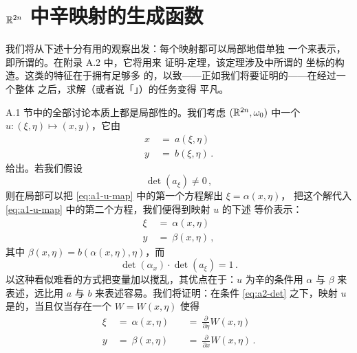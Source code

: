 

\section{\texorpdfstring{$\mathbb{R}^{2n}$ 中辛映射的生成函数}{R2n 中辛映射的生成函数}}
\label{sec:generating-functions}

我们将从下述十分有用的观察出发：每个\trSymplectic{}映射都可以局部地借单独%
一个\trScalarFunction{}来表示，即所谓的\trGeneratingFunction。在附录 A.2 中，它将用来%
证明\trArnold-\trJost{}定理，该定理涉及\trIntegrableSystem{}中所谓的%
\trActionAngle{}坐标的构造。这类\trHamiltonianSystem{}的特征在于拥有足够多%
的\trFirstIntegral，以致——正如我们将要证明的——在经过一个整体\trSymplectic{}%
\trTransformation{}之后，求解（或者说「\trIntegral」）\trDifferentialEquation{}的任务变得%
平凡。

A.1 节中的全部讨论本质上都是局部性的。我们考虑 $(\mathbb{R}^{2n},\omega_{0})$ 中一个%
\trSymplectic\trMapping{} $u:(\xi,\eta)\mapsto(x,y)$，它由
\begin{equation}\label{eq:a1-u-map}
\begin{aligned}
x\ &=\ a(\xi,\eta)\\
y\ &=\ b(\xi,\eta)\,.
\end{aligned}
\end{equation}
给出。若我们假设
\begin{equation}\label{eq:a2-det}
\det(a_{\xi})\neq0\,,
\end{equation}
则在局部可以把 \eqref{eq:a1-u-map} 中的第一个方程解出 $\xi=\alpha(x,\eta)$，%
把这个解代入 \eqref{eq:a1-u-map} 中的第二个方程，我们便得到映射 $u$ 的下述%
等价表示：
\[
\begin{aligned}
\xi\ &=\ \alpha(x,\eta)\\
y\ &=\ \beta(x,\eta)\,,
\end{aligned}
\]
其中 $\beta(x,\eta)=b(\alpha(x,\eta),\eta)$，而
\[
\det(\alpha_{x})\cdot\det(a_{\xi})=1\,.
\]
以这种看似难看的方式把变量加以搅乱，其优点在于：$u$ 为辛的条件用 $\alpha$ 与%
$\beta$ 来表述，远比用 $a$ 与 $b$ 来表述容易。我们将证明：在条件%
 \eqref{eq:a2-det} 之下，映射 $u$ 是\trSymplectic{}的，当且仅当存在一个%
\trScalarFunction{} $W=W(x,\eta)$ 使得
\begin{equation}\label{eq:a3-generating}
\begin{aligned}
\xi\ &=\ \alpha(x,\eta)\ &&=\ \frac{\partial}{\partial\eta}W(x,\eta)\\
y\ &=\ \beta(x,\eta)\ &&=\ \frac{\partial}{\partial x}W(x,\eta)\,.
\end{aligned}
\end{equation}


